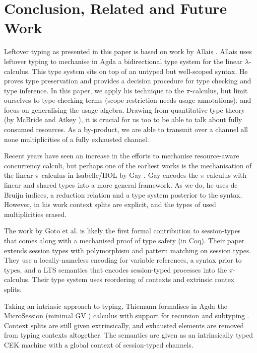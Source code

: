 \documentclass[a4paper,UKenglish,cleveref,autoref,thm-restate,authorcolumns]{lipics-v2019}
\theoremstyle{definition}
\newcommand{\lambdacalc}{$\lambda$-calculus}
\newcommand{\picalc}{$\pi$-calculus}
\begin{document}
\section{Conclusion, Related and Future Work}

Leftover typing as presented in this paper is based on work by Allais \cite{Allais2018a}.
Allais uses leftover typing to mechanise in Agda a bidirectional type system for the linear \lambdacalc{}.
This type system sits on top of an untyped but well-scoped syntax.
He proves type preservation and provides a decision procedure for type checking and type inference.
In this paper, we apply his technique to the \picalc{}, but limit ourselves to type-checking terms (scope restriction needs usage annotations), and focus on generalising the usage algebra.
Drawing from quantitative type theory (by McBride and Atkey \cite{McBride2016, Atkey2018}), it is crucial for us too to be able to talk about fully consumed resources.
As a by-product, we are able to transmit over a channel all none multiplicities of a fully exhausted channel.

Recent years have seen an increase in the efforts to mechanise resource-aware concurrency calculi, but perhaps one of the earliest works is the mechanisation of the linear \picalc{} in Isabelle/HOL by Gay \cite{Gay2001}.
Gay encodes the \picalc{} with linear and shared types into a more general framework.
As we do, he uses de Bruijn indices, a reduction relation and a type system posterior to the syntax.
However, in his work context splits are explicit, and the types of used multiplicities erased.

The work by Goto et al. \cite{Goto2016a} is likely the first formal contribution to session-types that comes along with a mechanised proof of type safety (in Coq). 
Their paper extends session types with polymorphism and pattern matching on session types.
They use a locally-nameless encoding for variable references, a syntax prior to types, and a LTS semantics that encodes session-typed processes into the \picalc{}.
Their type system uses reordering of contexts and extrinsic contex splits. 

Taking an intrinsic approach to typing, Thiemann formalises in Agda the MicroSession (minimal GV \cite{Gay2010}) calculus with support for recursion and subtyping \cite{Thiemann2019}.
Context splits are still given extrinsically, and exhausted elements are removed from typing contexts altogether.
The semantics are given as an intrinsically typed CEK machine with a global context of session-typed channels.
\end{document}
